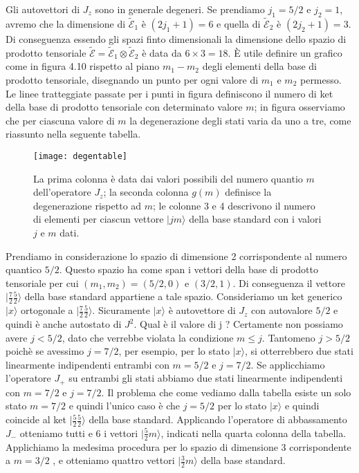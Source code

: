 Gli autovettori di $J_z$ sono in generale degeneri. Se prendiamo $j_1 = 5/2$ e $j_2 = 1$, avremo che la dimensione di $\mathcal{\tilde{E}}_1$ \`e $(2j_1 +1) = 6$ e quella di $\mathcal{\tilde{E}}_2$ \`e $(2j_2 +1) = 3$. Di conseguenza essendo gli spazi finto dimensionali la dimensione dello spazio di prodotto tensoriale $\mathcal{\tilde{E}} = \mathcal{\tilde{E}}_1 \otimes \mathcal{\tilde{E}}_2$ \`e data da $6 \times 3 = 18$. \`E utile definire un grafico come in figura 4.10  rispetto al piano $m_1-m_2$ degli elementi della base di prodotto tensoriale, disegnando un punto per ogni valore di $m_1 $ e $m_2$ permesso. Le linee tratteggiate passate per i punti in figura definiscono il numero di ket della base di prodotto tensoriale con determinato valore $m$; in figura osserviamo che per ciascuna valore di $m$ la degenerazione degli stati varia da uno a tre, come riassunto nella seguente tabella.

\begin{figure}[!ht]
\texttt{[image: degentable]}	
\centering
\caption{La prima colonna \`e data dai valori possibili del numero quantio $m$ dell'operatore $J_z$; la seconda colonna $g(m)$ definisce la degenerazione rispetto ad $m$; le colonne 3 e 4 descrivono il numero di elementi per ciascun vettore $|jm\rangle $ della base standard  con i valori $j$ e $m$ dati. }
\end{figure}
\newpage

Prendiamo in considerazione lo spazio di dimensione 2 corrispondente al numero quantico $5/2$. Questo spazio ha come span i vettori della base di prodotto tensoriale per cui $(m_1,m_2) = (5/2,0)$ e $(3/2,1)$. Di conseguenza il vettore $|\frac{7}{2} \frac{5}{2}\rangle$ della base standard appartiene a tale spazio. Consideriamo un ket generico $|x \rangle $ ortogonale a $|\frac{7}{2} \frac{5}{2}\rangle$. Sicuramente $|x \rangle$ \`e autovettore di $J_z$ con autovalore $5/2$ e quindi \`e anche autostato di $J^2$. Qual \`e il valore di j ? Certamente non possiamo avere $j < 5/2$, dato che verrebbe violata la condizione $m \leq j$.  Tantomeno $j > 5/2$ poich\`e se avessimo $j = 7/2$, per esempio, per lo stato $|x \rangle$, si otterrebbero due stati linearmente indipendenti entrambi con $m = 5/2$ e $j = 7/2$. Se applicchiamo l'operatore $J_+$ su entrambi gli stati abbiamo due stati linearmente indipendenti con $m = 7/2$ e $j = 7/2$. Il problema che come vediamo dalla tabella esiste un solo stato $m = 7/2$ e quindi l'unico caso \`e che $j = 5/2$ per lo stato $|x \rangle$ e quindi coincide al ket $|\frac{5}{2}\frac{5}{2} \rangle$ della base standard. Applicando l'operatore di abbassamento $J_{-}$  otteniamo tutti e 6 i vettori $|\frac{5}{2}m \rangle$, indicati nella quarta colonna della tabella. Applichiamo la medesima procedura per lo spazio di dimensione 3 corrispondente a $m = 3/2$ , e otteniamo quattro vettori $|\frac{3}{2}m \rangle$ della base standard.

